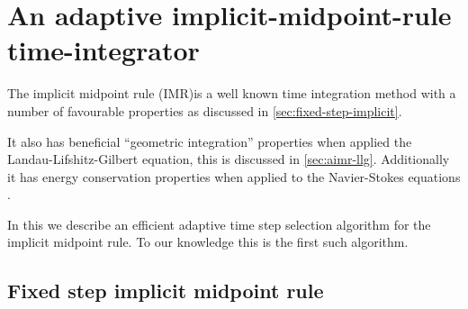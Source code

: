 

\chapter{An adaptive implicit-midpoint-rule time-integrator}
\label{sec:adaptive-imr}


The implicit midpoint rule (IMR)is a well known time integration method\cite[pg. 204]{HairerNorsettWanner} with a number of favourable properties as discussed in \autoref{sec:fixed-step-implicit}.






It also has beneficial ``geometric integration'' properties when applied the Landau-Lifshitz-Gilbert equation, this is discussed in \autoref{sec:aimr-llg}. 
Additionally it has energy conservation properties when applied to the Navier-Stokes equations \cite{Sanderse2013}.


In this \secpaper{} we describe an efficient adaptive time step selection algorithm for the implicit midpoint rule. To our knowledge this is the first such algorithm.

\section{Fixed step implicit midpoint rule}
\label{sec:fixed-step-implicit}

